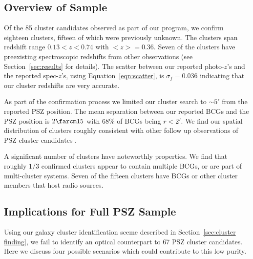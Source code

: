 \documentclass[apj, revtex4-1]{emulateapj}
\begin{document}
\subsection{Overview of Sample}
Of the 85 cluster candidates observed as part of our program, we confirm eighteen clusters, fifteen of which were previously unknown. The clusters span redshift range $ 0.13 < z < 0.74$ with $<z> = 0.36$. Seven of the clusters have preexisting spectroscopic redshifts from other observations (see Section~\ref{sec:results} for details). The scatter between our reported photo-$z$'s and the reported spec-$z$'s, using Equation~\ref{eqn:scatter}, is $\sigma_f = 0.036$ indicating that our cluster redshifts are very accurate.

As part of the confirmation process we limited our cluster search to $\sim$$5'$ from the reported PSZ position. The mean separation between our reported BCGs and the PSZ position is $2\farcm15$ with 68\% of BCGs being $r < 2'$. We find our spatial distribution of clusters roughly consistent with other follow up observations of PSZ cluster candidates .

A significant number of clusters have noteworthly properties. We find that roughly $1/3$ confirmed clusters appear to contain multiple BCGs, or are part of multi-cluster systems. Seven of the fifteen clusters have BCGs or other cluster members that host radio sources.


\subsection{Implications for Full PSZ Sample}
Using our galaxy cluster identification sceme described in Section~\ref{sec:cluster finding}, we fail to identify an optical counterpart to 67 PSZ cluster candidates. Here we discuss four possible scenarios which could contribute to this low purity.
\end{document}
